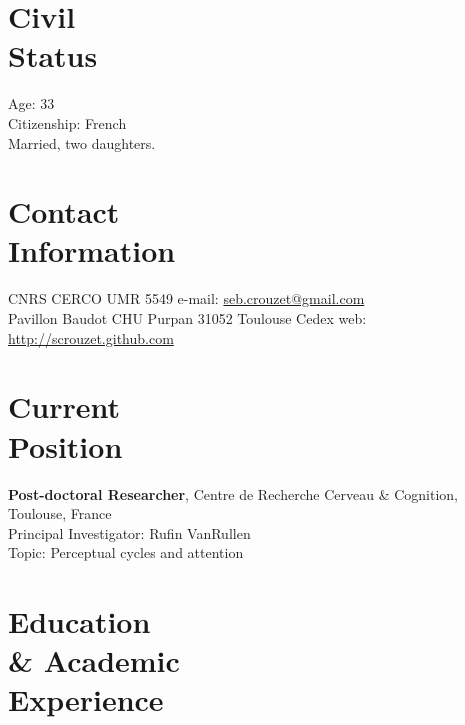 \documentclass[margin,line]{resume}
\begin{document}
\begin{resume}

    \section{\mysidestyle Civil\\Status}
    Age: 33\\
    Citizenship: French\\
    Married, two daughters.
    \vspace{3mm}
 

    \section{\mysidestyle Contact\\Information}
    CNRS CERCO UMR 5549             \hfill e-mail: \href{mailto:seb.crouzet@gmail.com}{seb.crouzet@gmail.com} \\
    Pavillon Baudot CHU Purpan 31052 Toulouse Cedex      \hfill web: \url{http://scrouzet.github.com} 
    
	
    \vspace{3mm}
    \section{\mysidestyle Current\\Position}
    \textbf{Post-doctoral Researcher}, Centre de Recherche Cerveau \& Cognition, Toulouse, France\\
    Principal Investigator: Rufin VanRullen\\
    Topic: Perceptual cycles and attention 

    \vspace{3mm}
    \section{\mysidestyle Education \\ \& Academic \\ Experience }
    

\end{resume}
\end{document}
